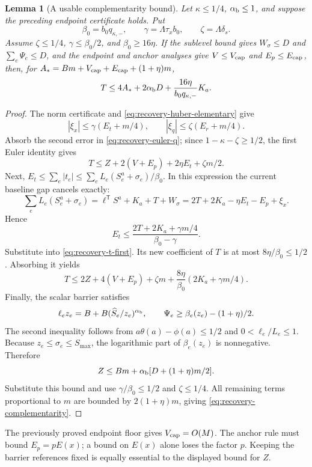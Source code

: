 \documentclass[11pt]{article}
\newtheorem{lemma}[theorem]{Lemma}
\theoremstyle{definition}\newtheorem{definition}[theorem]{Definition}
\theoremstyle{remark}\newtheorem{remark}[theorem]{Remark}
\begin{document}
\begin{lemma}[A usable complementarity bound]
\label{lem:recovery-complementarity}
Let $\kappa\le1/4$, $\alpha_{\rm b}\le1$, and suppose the preceding
endpoint certificate holds. Put
\[
 \beta_0=b_0q_{\kappa,-},\qquad
 \gamma=\Lambda\tau_xb_0,\qquad \zeta=\Lambda\delta_s.
\]
Assume $\zeta\le1/4$, $\gamma\le\beta_0/2$, and $\beta_0\ge16\eta$.
If the sublevel bound gives
$W_\sigma\le D$ and $\sum_e\Psi_e\le D$, and the endpoint and
anchor analyses give $V\le V_{\rm cap}$ and $E_p\le E_{\rm cap}$,
then, for
$A_*=Bm+V_{\rm cap}+E_{\rm cap}+(1+\eta)m$,
\begin{equation}\label{eq:recovery-complementarity}
 T\le4A_*+2\alpha_{\rm b}D+
                    \frac{16\eta}{b_0q_{\kappa,-}}K_a.
\end{equation}
\end{lemma}

\begin{proof}
The norm certificate and \eqref{eq:recovery-huber-elementary} give
\[
 |\xi_x|\le\gamma(E_t+m/4),\qquad
 |\xi_q|\le\zeta(E_r+m/4).
\]
Absorb the second error in \eqref{eq:recovery-euler-q}; since
$1-\kappa-\zeta\ge1/2$, the first Euler identity gives
\begin{equation}\label{eq:recovery-t-first}
 T\le Z+2(V+E_p)+2\eta E_t+\zeta m/2.
\end{equation}
Next, $E_t\le\sum_e|t_e|\le
\sum_eL_e(S^a_e+\sigma_e)/\beta_0$. In this expression the current
baseline gap cancels exactly:
\[
 \sum_eL_e(S^a_e+\sigma_e)
 =\ell^{\mathsf T}S^a+K_a+T+W_\sigma
 =2T+2K_a-\eta E_t-E_p+\xi_x.
\]
Hence
\[
 E_t\le\frac{2T+2K_a+\gamma m/4}{\beta_0-\gamma}.
\]
Substitute into \eqref{eq:recovery-t-first}. Its new coefficient of
$T$ is at most $8\eta/\beta_0\le1/2$. Absorbing it yields
\[
 T\le2Z+4(V+E_p)+\zeta m+
                    \frac{8\eta}{\beta_0}(2K_a+\gamma m/4).
\]
Finally, the scalar barrier satisfies
\[
 \ell_ez_e=B+B(\widehat S_e/z_e)^{\alpha_{\rm b}},\qquad
 \Psi_e\ge\beta_e(z_e)-(1+\eta)/2.
\]
The second inequality follows from
$a\theta(a)-\phi(a)\le1/2$ and $0<\ell_e/L_e\le1$.
Because $z_e\le\sigma_e\le S_{\max}$, the logarithmic part of
$\beta_e(z_e)$ is nonnegative. Therefore
\[
 Z\le Bm+\alpha_{\rm b}[D+(1+\eta)m/2].
\]
Substitute this bound and use $\gamma/\beta_0\le1/2$ and
$\zeta\le1/4$. All remaining terms proportional to $m$ are bounded
by $2(1+\eta)m$, giving \eqref{eq:recovery-complementarity}.
\end{proof}

The previously proved endpoint floor gives $V_{\rm cap}=O(M)$.
The anchor rule must bound $E_p=pE(x)$; a bound on $E(x)$ alone loses
the factor $p$. Keeping the barrier references fixed is equally
essential to the displayed bound for $Z$.
\end{document}
